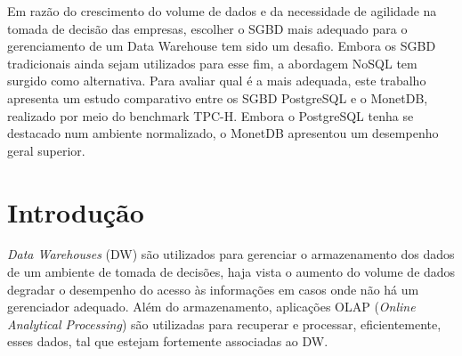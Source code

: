 \documentclass[12pt]{article}
\begin{document}
\begin{resumo}

Em razão do crescimento do volume de dados 
e da necessidade de agilidade na tomada de decisão das empresas, 
escolher o SGBD mais adequado para o gerenciamento de um 
Data Warehouse tem sido um desafio. Embora os SGBD 
tradicionais ainda sejam utilizados para esse fim, a 
abordagem NoSQL tem surgido como alternativa. 
Para avaliar qual é a mais adequada, este trabalho apresenta 
um estudo comparativo entre os SGBD PostgreSQL e o MonetDB, 
realizado por meio do benchmark TPC-H. Embora o PostgreSQL tenha 
se destacado num ambiente normalizado, o MonetDB apresentou um 
desempenho geral superior.

\end{resumo}

\section{Introdução}

\textit{Data Warehouses} (DW) são utilizados para gerenciar 
o armazenamento dos dados de um ambiente de tomada de decisões, 
haja vista o aumento do volume de dados degradar o desempenho do 
acesso às informações em casos onde não há um gerenciador adequado. 
Além do armazenamento, aplicações OLAP (\textit{Online Analytical 
Processing}) 
são utilizadas para recuperar e processar, eficientemente, esses dados, 
tal que estejam fortemente associadas 
ao DW.
\end{document}

